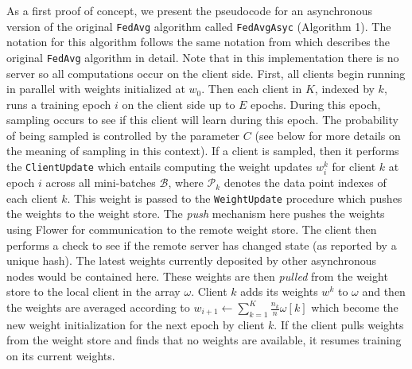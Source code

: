 \documentclass[twocolumn, switch]{article} %
\begin{document}
As a first proof of concept, we present the pseudocode for an asynchronous version of the original \texttt{FedAvg} algorithm called \texttt{FedAvgAsyc} (Algorithm 1). The notation for this algorithm follows the same notation from \cite{fed_2} which describes the original \texttt{FedAvg} algorithm in detail. Note that in this implementation there is no server so all computations occur on the client side. First, all clients begin running in parallel with weights initialized at $w_0$. Then each client in $K$, indexed by $k$, runs a training epoch $i$ on the client side up to $E$ epochs. During this epoch, sampling occurs to see if this client will learn during this epoch. The probability of being sampled is controlled by the parameter $C$ (see below for more details on the meaning of sampling in this context). If a client is sampled, then it performs the \texttt{ClientUpdate} which entails computing the weight updates $w^k_i$ for client $k$ at epoch $i$ across all mini-batches $\mathcal{B}$, where $\mathcal{P}_k$ denotes the data point indexes of each client $k$. This weight is passed to the \texttt{WeightUpdate} procedure which pushes the weights to the weight store. The \textit{push} mechanism here pushes the weights using Flower for communication to the remote weight store. The client then performs a check to see if the remote server has changed state (as reported by a unique hash). The latest weights currently deposited by other asynchronous nodes would be contained here. These weights are then \textit{pulled} from the weight store to the local client in the array $\omega$. Client $k$ adds its weights $w^k$ to $\omega$ and then the weights are averaged according to $w_{i+1} \gets \sum_{k=1}^K \frac{n_k}{n} \omega[k]$ which become the new weight initialization for the next epoch by client $k$. If the client pulls weights from the weight store and finds that no weights are available, it resumes training on its current weights.
\end{document}
